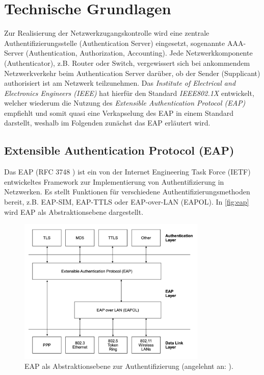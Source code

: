 \documentclass[conference]{IEEEtran}
\begin{document}
%

\section{Technische Grundlagen}
Zur Realisierung der Netzwerkzugangskontrolle wird eine zentrale Authentifizierungsstelle (Authentication Server) eingesetzt, sogenannte AAA-Server (Authentication, Authorization, Accounting). Jede Netzwerkkomponente (Authenticator), z.B. Router oder Switch, vergewissert sich bei ankommendem Netzwerkverkehr beim Authentication Server darüber, ob der Sender (Supplicant) authorisiert ist am Netzwerk teilzunehmen. Das \emph{Institute of Electrical and Electronics Engineers (IEEE)} hat hierfür den Standard \emph{IEEE802.1X} entwickelt, welcher wiederum die Nutzung des \emph{Extensible Authentication Protocol (EAP)} empfiehlt und somit quasi eine Verkapselung des EAP in einem Standard darstellt, weshalb im Folgenden zunächst das EAP erläutert wird.

\subsection{Extensible Authentication Protocol (EAP)}
Das EAP (RFC 3748 \cite{aboba2004extensible}) ist ein von der Internet Engineering Task Force (IETF) entwickeltes Framework zur Implementierung von Authentifizierung in Netzwerken. Es stellt Funktionen für verschiedene Authentifizierungsmethoden bereit, z.B. EAP-SIM, EAP-TTLS oder EAP-over-LAN (EAPOL). \cite{1561920} In \autoref{fig:eap} wird EAP als Abstraktionsebene dargestellt.\\

\begin{figure}[hbt]
	\centering
	\includegraphics[width=9cm]{figures/EAP}
	\caption{EAP als Abstraktionsebene zur Authentifizierung (angelehnt an: \cite{1561920}).}
	\label{fig:eap}
\end{figure}
\end{document}
